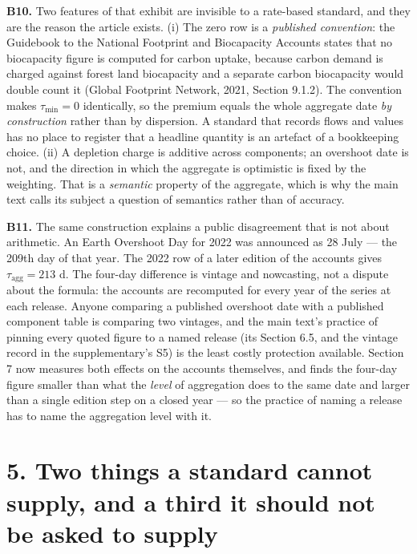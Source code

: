 \documentclass[11pt]{article}
\begin{document}
\textbf{B10.} Two features of that exhibit are invisible to a rate-based standard, and they are the reason the article exists. (i) The zero row is a \emph{published convention}: the Guidebook to the National Footprint and Biocapacity Accounts states that no biocapacity figure is computed for carbon uptake, because carbon demand is charged against forest land biocapacity and a separate carbon biocapacity would double count it (Global Footprint Network, 2021, Section 9.1.2). The convention makes \(\tau_{\min}=0\) identically, so the premium equals the whole aggregate date \emph{by construction} rather than by dispersion. A standard that records flows and values has no place to register that a headline quantity is an artefact of a bookkeeping choice. (ii) A depletion charge is additive across components; an overshoot date is not, and the direction in which the aggregate is optimistic is fixed by the weighting. That is a \emph{semantic} property of the aggregate, which is why the main text calls its subject a question of semantics rather than of accuracy.

\textbf{B11.} The same construction explains a public disagreement that is not about arithmetic. An Earth Overshoot Day for 2022 was announced as 28 July --- the 209th day of that year. The 2022 row of a later edition of the accounts gives \(\tau_{\mathrm{agg}} = 213\) d. The four-day difference is vintage and nowcasting, not a dispute about the formula: the accounts are recomputed for every year of the series at each release. Anyone comparing a published overshoot date with a published component table is comparing two vintages, and the main text's practice of pinning every quoted figure to a named release (its Section 6.5, and the vintage record in the supplementary's S5) is the least costly protection available. Section 7 now measures both effects on the accounts themselves, and finds the four-day figure smaller than what the \emph{level} of aggregation does to the same date and larger than a single edition step on a closed year --- so the practice of naming a release has to name the aggregation level with it.

\vspace{0.8em}

\section*{5. Two things a standard cannot supply, and a third it should not be asked to supply}\label{5-two-things-a-standard-cannot-supply-and-a-third-it-should-not-be-ask}
\end{document}
